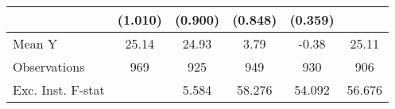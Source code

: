 {\begin{tabular}{l*{5}{c}}
            &     (1.010)         &     (0.900)         &     (0.848)         &     (0.359)         &                     \\
\midrule
Mean Y      &       25.14         &       24.93         &        3.79         &       -0.38         &       25.11         \\
Observations&         969         &         925         &         949         &         930         &         906         \\
Exc. Inst. F-stat&                     &       5.584         &      58.276         &      54.092         &      56.676         \\
\bottomrule
\end{tabular}
}

